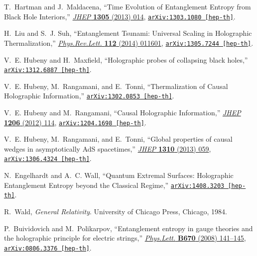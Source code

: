 \documentclass[12pt]{article}
\begin{document}
\begin{thebibliography}{10}
T.~Hartman and J.~Maldacena, ``{Time Evolution of Entanglement Entropy from
  Black Hole Interiors},''
  \href{http://dx.doi.org/10.1007/JHEP05(2013)014}{{\em JHEP} {\bf 1305} (2013)
   014},
\href{http://arxiv.org/abs/1303.1080}{{\tt arXiv:1303.1080 [hep-th]}}.

H.~Liu and S.~J. Suh, ``{Entanglement Tsunami: Universal Scaling in Holographic
  Thermalization},''
  \href{http://dx.doi.org/10.1103/PhysRevLett.112.011601}{{\em Phys.Rev.Lett.}
  {\bf 112} (2014)  011601},
\href{http://arxiv.org/abs/1305.7244}{{\tt arXiv:1305.7244 [hep-th]}}.

V.~E. Hubeny and H.~Maxfield, ``{Holographic probes of collapsing black
  holes},''
\href{http://arxiv.org/abs/1312.6887}{{\tt arXiv:1312.6887 [hep-th]}}.

V.~E. Hubeny, M.~Rangamani, and E.~Tonni, ``{Thermalization of Causal
  Holographic Information},''
\href{http://arxiv.org/abs/1302.0853}{{\tt arXiv:1302.0853 [hep-th]}}.

V.~E. Hubeny and M.~Rangamani, ``{Causal Holographic Information},''
  \href{http://dx.doi.org/10.1007/JHEP06(2012)114}{{\em JHEP} {\bf 1206} (2012)
   114},
\href{http://arxiv.org/abs/1204.1698}{{\tt arXiv:1204.1698 [hep-th]}}.

V.~E. Hubeny, M.~Rangamani, and E.~Tonni, ``{Global properties of causal wedges
  in asymptotically AdS spacetimes},''
  \href{http://dx.doi.org/10.1007/JHEP10(2013)059}{{\em JHEP} {\bf 1310} (2013)
   059},
\href{http://arxiv.org/abs/1306.4324}{{\tt arXiv:1306.4324 [hep-th]}}.

N.~Engelhardt and A.~C. Wall, ``{Quantum Extremal Surfaces: Holographic
  Entanglement Entropy beyond the Classical Regime},''
\href{http://arxiv.org/abs/1408.3203}{{\tt arXiv:1408.3203 [hep-th]}}.

R.~Wald, {\em {General Relativity}}.
\newblock University of Chicago Press, Chicago, 1984.

P.~Buividovich and M.~Polikarpov, ``{Entanglement entropy in gauge theories and
  the holographic principle for electric strings},''
  \href{http://dx.doi.org/10.1016/j.physletb.2008.10.032}{{\em Phys.Lett.} {\bf
  B670} (2008)  141--145},
\href{http://arxiv.org/abs/0806.3376}{{\tt arXiv:0806.3376 [hep-th]}}.


\end{thebibliography}
\end{document}
